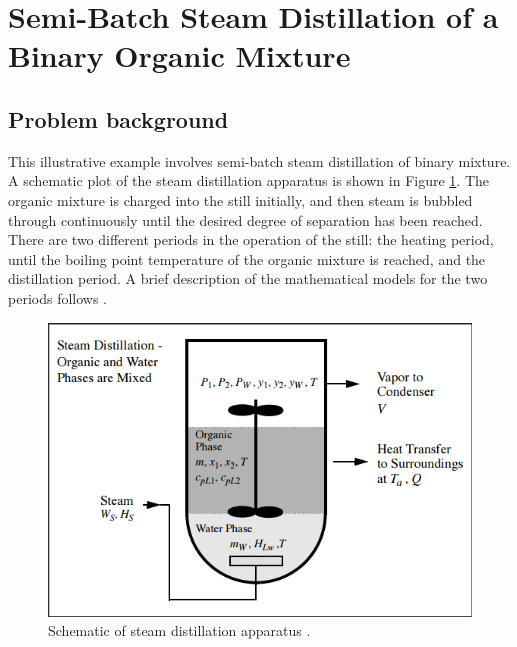 \documentclass[12pt]{report}
\begin{document}
\section{Semi-Batch Steam Distillation of a Binary Organic Mixture}
\subsection{Problem background}
This illustrative example involves semi-batch steam distillation of binary mixture. A schematic plot of the steam distillation apparatus is shown in Figure \ref{SD}. The organic mixture is charged into the still initially, and then steam is bubbled through continuously until the desired degree of separation has been reached. There are two different periods in the operation of the still: the heating period, until the boiling point temperature of the organic mixture is reached, and the distillation period. A brief description of the mathematical models for the two periods follows \cite{PHD}.

\begin{figure}
\centering
\includegraphics[width=0.8\linewidth]{SD}
\caption{Schematic of steam distillation apparatus \cite{PHD}.}
\label{SD}
\end{figure}
\end{document}
